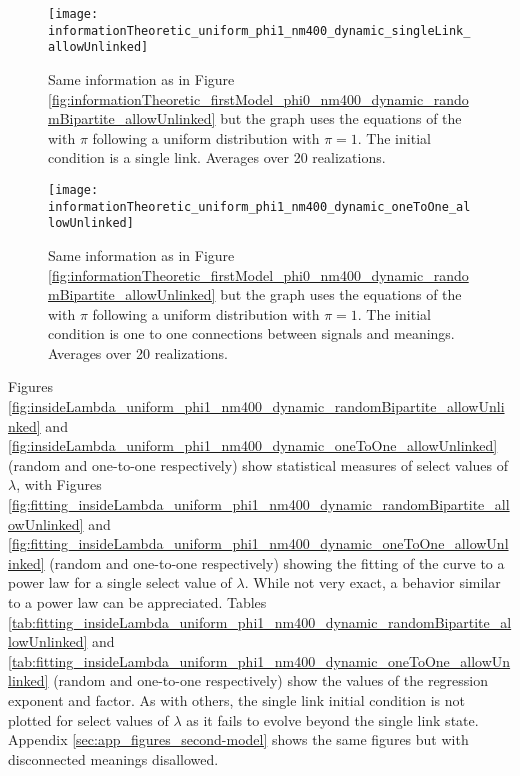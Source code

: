 \begin{figure}
  \centering
  \texttt{[image: informationTheoretic\_uniform\_phi1\_nm400\_dynamic\_singleLink\_allowUnlinked]}
  \caption{Same information as in Figure \ref{fig:informationTheoretic_firstModel_phi0_nm400_dynamic_randomBipartite_allowUnlinked} but the graph uses the equations of the \secondmodel{} with $\pi$ following a uniform distribution with $\pi=1$.
The initial condition is a single link. Averages over 20 realizations.}
  \label{fig:informationTheoretic_uniform_phi1_nm400_dynamic_singleLink_allowUnlinked}
\end{figure}

\begin{figure}
  \centering
  \texttt{[image: informationTheoretic\_uniform\_phi1\_nm400\_dynamic\_oneToOne\_allowUnlinked]}
  \caption{Same information as in Figure \ref{fig:informationTheoretic_firstModel_phi0_nm400_dynamic_randomBipartite_allowUnlinked} but the graph uses the equations of the \secondmodel{} with $\pi$ following a uniform distribution with $\pi=1$.
The initial condition is one to one connections between signals and meanings. Averages over 20 realizations.}
  \label{fig:informationTheoretic_uniform_phi1_nm400_dynamic_oneToOne_allowUnlinked}
\end{figure}

Figures \ref{fig:insideLambda_uniform_phi1_nm400_dynamic_randomBipartite_allowUnlinked} and \ref{fig:insideLambda_uniform_phi1_nm400_dynamic_oneToOne_allowUnlinked} (random and one-to-one respectively) show statistical measures of select values of $\lambda$, with Figures \ref{fig:fitting_insideLambda_uniform_phi1_nm400_dynamic_randomBipartite_allowUnlinked} and \ref{fig:fitting_insideLambda_uniform_phi1_nm400_dynamic_oneToOne_allowUnlinked} (random and one-to-one respectively) showing the fitting of the curve to a power law for a single select value of $\lambda$.
While not very exact, a behavior similar to a power law can be appreciated.
Tables \ref{tab:fitting_insideLambda_uniform_phi1_nm400_dynamic_randomBipartite_allowUnlinked} and \ref{tab:fitting_insideLambda_uniform_phi1_nm400_dynamic_oneToOne_allowUnlinked} (random and one-to-one respectively) show the values of the regression exponent and factor.
As with others, the single link initial condition is not plotted for select values of $\lambda$ as it fails to evolve beyond the single link state.
Appendix \ref{sec:app_figures_second-model} shows the same figures but with disconnected meanings disallowed.

